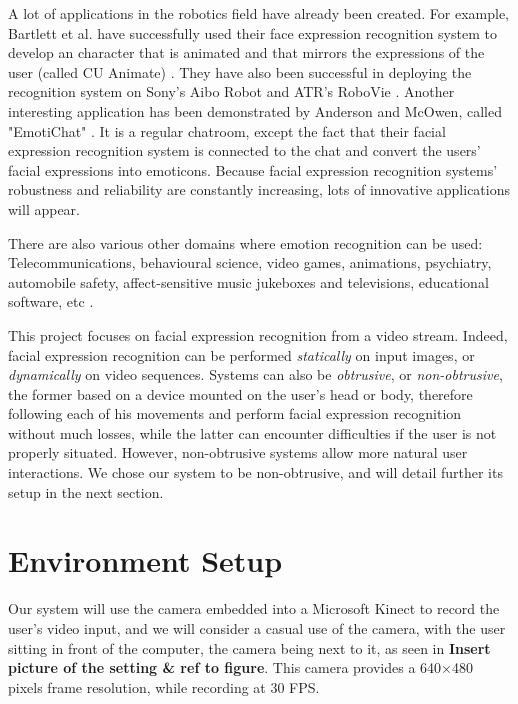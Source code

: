 \noindent A lot of applications in the robotics field have already been created. For example, Bartlett et al. have successfully used their face expression recognition system to develop an character that is animated and that mirrors the expressions of the user (called CU Animate) \cite{BAR03}. They have also been successful in deploying the recognition system on Sony's Aibo Robot and ATR's RoboVie \cite{BAR03}. Another interesting application has been demonstrated by Anderson and McOwen, called "EmotiChat" \cite{AND06}. It is a regular chatroom, except the fact that their facial expression recognition system is connected to the chat and convert the users' facial expressions into emoticons. Because facial expression recognition systems' robustness and reliability are constantly increasing, lots of innovative applications will appear.
\newline

\noindent There are also various other domains where emotion recognition can be used: Telecommunications, behavioural science, video games, animations, psychiatry, automobile safety, affect-sensitive music jukeboxes and televisions, educational software, etc \cite{BET12}.
\newline

\noindent This project focuses on facial expression recognition from a video stream. Indeed, facial expression recognition can be performed \textit{statically} on input images, or \textit{dynamically} on video sequences. Systems can also be \textit{obtrusive}, or \textit{non-obtrusive}, the former based on a device mounted on the user's head or body, therefore following each of his movements and perform facial expression recognition without much losses, while the latter can encounter difficulties if the user is not properly situated. However, non-obtrusive systems allow more natural user interactions. We chose our system to be non-obtrusive, and will detail further its setup in the next section.
\newline

\section{Environment Setup}

\vspace{\baselineskip}
\noindent Our system will use the camera embedded into a Microsoft Kinect to record the user's video input, and we will consider a casual use of the camera, with the user sitting in front of the computer, the camera being next to it, as seen in \textbf{\color{red} Insert picture of the setting \& ref to figure}. This camera provides a 640$\times$480 pixels frame resolution, while recording at 30 FPS.
\newline


